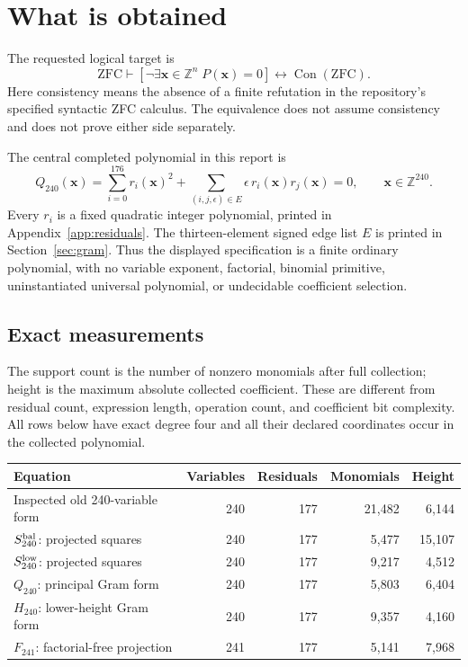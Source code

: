 \documentclass[11pt]{article}
\theoremstyle{remark}\newtheorem{remark}[theorem]{Remark}
\newcommand{\Z}{\mathbb Z}
\newcommand{\Con}{\operatorname{Con}}
\newcommand{\ZFC}{\mathrm{ZFC}}
\begin{document}
\tableofcontents
\newpage

\section{What is obtained}

The requested logical target is
\begin{equation}\label{eq:target}
\ZFC\vdash
\left[\neg\exists\boldsymbol x\in\Z^n\;P(\boldsymbol x)=0\right]
\longleftrightarrow \Con(\ZFC).
\end{equation}
Here consistency means the absence of a finite refutation in the
repository's specified syntactic ZFC calculus. The equivalence does not
assume consistency and does not prove either side separately.

The central completed polynomial in this report is
\begin{equation}\label{eq:principal}
\boxed{\quad Q_{240}(\boldsymbol x)=
\sum_{i=0}^{176}r_i(\boldsymbol x)^2+
\sum_{(i,j,\epsilon)\in E}\epsilon\,r_i(\boldsymbol x)r_j(\boldsymbol x)=0,
\qquad \boldsymbol x\in\Z^{240}.\quad}
\end{equation}
Every $r_i$ is a fixed quadratic integer polynomial, printed in
Appendix~\ref{app:residuals}. The thirteen-element signed edge list $E$ is
printed in Section~\ref{sec:gram}. Thus the displayed specification is a
finite ordinary polynomial, with no variable exponent, factorial, binomial
primitive, uninstantiated universal polynomial, or undecidable coefficient
selection.

\subsection{Exact measurements}

The support count is the number of nonzero monomials after full collection;
height is the maximum absolute collected coefficient. These are different
from residual count, expression length, operation count, and coefficient
bit complexity. All rows below have exact degree four and all their
declared coordinates occur in the collected polynomial.

\begin{center}\small
\begin{tabular}{p{}rrrr}
\toprule
Equation & Variables & Residuals & Monomials & Height\\\midrule
Inspected old 240-variable form & 240 & 177 & 21,482 & 6,144\\
$S_{240}^{\rm bal}$: projected squares & 240 & 177 & 5,477 & 15,107\\
$S_{240}^{\rm low}$: projected squares & 240 & 177 & 9,217 & 4,512\\
$Q_{240}$: principal Gram form & 240 & 177 & 5,803 & 6,404\\
$H_{240}$: lower-height Gram form & 240 & 177 & 9,357 & 4,160\\
$F_{241}$: factorial-free projection & 241 & 177 & 5,141 & 7,968\\
\bottomrule
\end{tabular}
\end{center}
\end{document}
